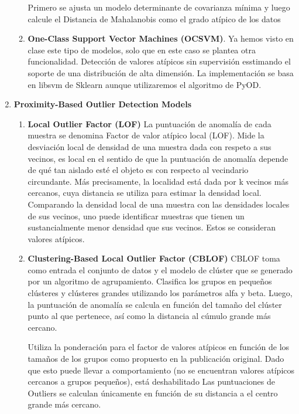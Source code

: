 \documentclass[12pt,twoside]{report}
\begin{document}
\begin{enumerate}
\begin{enumerate}
     Primero se ajusta un modelo determinante de covarianza mínima y luego calcule el
     Distancia de Mahalanobis como el grado atípico de los datos
		\item \textbf{One-Class Support Vector Machines (OCSVM)}. Ya hemos visto en clase este tipo de modelos, solo que en este caso se plantea otra funcionalidad. Detección de valores atípicos sin supervisión esstimando el soporte de una distribución de alta dimensión. La implementación se basa en libsvm de Sklearn aunque utilizaremos el algoritmo de PyOD.
	\end{enumerate}
	\item \textbf{Proximity-Based Outlier Detection Models}
	\begin{enumerate}
		\item \textbf{Local Outlier Factor (LOF)}
		La puntuación de anomalía de cada muestra se denomina Factor de valor atípico local (LOF).
     Mide la desviación local de densidad de una muestra dada con
     respeto a sus vecinos, es local en el sentido de que la puntuación de anomalía depende de qué tan aislado esté el objeto
     es con respecto al vecindario circundante.
     Más precisamente, la localidad está dada por k vecinos más cercanos, cuya distancia
     se utiliza para estimar la densidad local.
     Comparando la densidad local de una muestra con las densidades locales de
     sus vecinos, uno puede identificar muestras que tienen un sustancialmente menor
     densidad que sus vecinos. Estos se consideran valores atípicos.
		\item \textbf{Clustering-Based Local Outlier Factor (CBLOF)} 
		CBLOF toma como entrada el conjunto de datos y el modelo de clúster que se
     generado por un algoritmo de agrupamiento. Clasifica los grupos en pequeños
     clústeres y clústeres grandes utilizando los parámetros alfa y beta.
     Luego, la puntuación de anomalía se calcula en función del tamaño del clúster
     punto al que pertenece, así como la distancia al cúmulo grande más cercano.

     Utiliza la ponderación para el factor de valores atípicos en función de los tamaños de los grupos como
     propuesto en la publicación original. Dado que esto puede llevar a
     comportamiento (no se encuentran valores atípicos cercanos a grupos pequeños), está deshabilitado
     Las puntuaciones de Outliers se calculan únicamente en función de su distancia a
     el centro grande más cercano.


\end{enumerate}
\end{enumerate}
\end{document}
